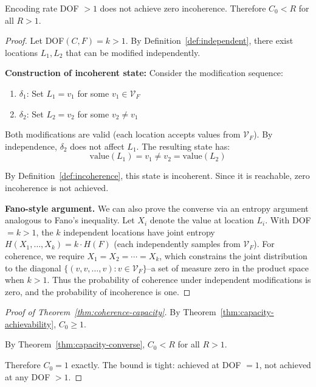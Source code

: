 \begin{theorem}[Converse]\label{thm:capacity-converse}
Encoding rate DOF $> 1$ does not achieve zero incoherence. Therefore $C_0 < R$ for all $R > 1$.
\end{theorem}

\begin{proof}
Let DOF$(C, F) = k > 1$. By Definition~\ref{def:independent}, there exist locations $L_1, L_2$ that can be modified independently.

\textbf{Construction of incoherent state:} Consider the modification sequence:
\begin{enumerate}
\tightlist
\item $\delta_1$: Set $L_1 = v_1$ for some $v_1 \in \mathcal{V}_F$
\item $\delta_2$: Set $L_2 = v_2$ for some $v_2 \neq v_1$
\end{enumerate}

Both modifications are valid (each location accepts values from $\mathcal{V}_F$). By independence, $\delta_2$ does not affect $L_1$. The resulting state has:
\[
\text{value}(L_1) = v_1 \neq v_2 = \text{value}(L_2)
\]

By Definition~\ref{def:incoherence}, this state is incoherent. Since it is reachable, zero incoherence is not achieved.

\textbf{Fano-style argument.} We can also prove the converse via an entropy argument analogous to Fano's inequality. Let $X_i$ denote the value at location $L_i$. With DOF $= k > 1$, the $k$ independent locations have joint entropy $H(X_1, \ldots, X_k) = k \cdot H(F)$ (each independently samples from $\mathcal{V}_F$). For coherence, we require $X_1 = X_2 = \cdots = X_k$, which constrains the joint distribution to the diagonal $\{(v, v, \ldots, v) : v \in \mathcal{V}_F\}$--a set of measure zero in the product space when $k > 1$. Thus the probability of coherence under independent modifications is zero, and the probability of incoherence is one.
\end{proof}

\begin{proof}[Proof of Theorem~\ref{thm:coherence-capacity}]
By Theorem~\ref{thm:capacity-achievability}, $C_0 \geq 1$.

By Theorem~\ref{thm:capacity-converse}, $C_0 < R$ for all $R > 1$.

Therefore $C_0 = 1$ exactly. The bound is tight: achieved at DOF $= 1$, not achieved at any DOF $> 1$.
\end{proof}

